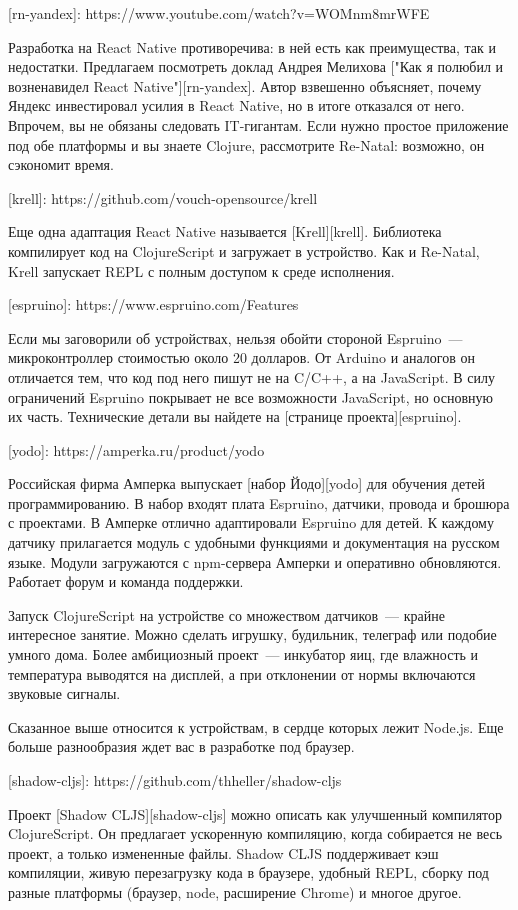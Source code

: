 [rn-yandex]: https://www.youtube.com/watch?v=WOMnm8mrWFE

Разработка на React Native противоречива: в ней есть как преимущества, так и недостатки. Предлагаем посмотреть доклад Андрея Мелихова ["Как я полюбил и возненавидел React Native"][rn-yandex]. Автор взвешенно объясняет, почему Яндекс инвестировал усилия в React Native, но в итоге отказался от него. Впрочем, вы не обязаны следовать IT-гигантам. Если нужно простое приложение под обе платформы и вы знаете Clojure, рассмотрите Re-Natal: возможно, он сэкономит время.

[krell]: https://github.com/vouch-opensource/krell

Еще одна адаптация React Native называется [Krell][krell]. Библиотека компилирует код на ClojureScript и загружает в устройство. Как и Re-Natal, Krell запускает REPL с полным доступом к среде исполнения.

[espruino]: https://www.espruino.com/Features

Если мы заговорили об устройствах, нельзя обойти стороной Espruino~--- микроконтроллер стоимостью около 20 долларов. От Arduino и аналогов он отличается тем, что код под него пишут не на C/C++, а на JavaScript. В силу ограничений Espruino покрывает не все возможности JavaScript, но основную их часть. Технические детали вы найдете на [странице проекта][espruino].

[yodo]: https://amperka.ru/product/yodo

Российская фирма Амперка выпускает [набор Йодо][yodo] для обучения детей программированию. В набор входят плата Espruino, датчики, провода и брошюра с проектами. В Амперке отлично адаптировали Espruino для детей. К каждому датчику прилагается модуль с удобными функциями и документация на русском языке. Модули загружаются с npm-сервера Амперки и оперативно обновляются. Работает форум и команда поддержки.

Запуск ClojureScript на устройстве со множеством датчиков~--- крайне интересное занятие. Можно сделать игрушку, будильник, телеграф или подобие умного дома. Более амбициозный проект~--- инкубатор яиц, где влажность и температура выводятся на дисплей, а при отклонении от нормы включаются звуковые сигналы.

Сказанное выше относится к устройствам, в сердце которых лежит Node.js. Еще больше разнообразия ждет вас в разработке под браузер.

[shadow-cljs]: https://github.com/thheller/shadow-cljs

Проект [Shadow CLJS][shadow-cljs] можно описать как улучшенный компилятор ClojureScript. Он предлагает ускоренную компиляцию, когда собирается не весь проект, а только измененные файлы. Shadow CLJS поддерживает кэш компиляции, живую перезагрузку кода в браузере, удобный REPL, сборку под разные платформы (браузер, node, расширение Chrome) и многое другое.


